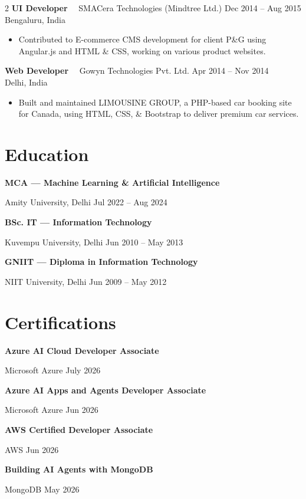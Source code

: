 \documentclass[10pt,a4paper]{article}
\newcommand{\job}[4]{%
  \vspace{2pt}
  {\fontsize{10.5}{12}\bfseries\color{sidebar}#1}
  {\color{textmuted}\ \textbar\ #2}
  \hfill
  {\fontsize{8.8}{10}\color{accent}#3}\\
  {\fontsize{8.7}{10}\color{textmuted}#4}
  \vspace{1pt}
}
\newcommand{\edu}[3]{%
  {\fontsize{9}{11}\bfseries\color{sidebar}#1}\par
  {\fontsize{8.2}{10}\color{textmuted}#2}
  \hfill {\fontsize{8}{10}\color{textmuted}#3}\par
  \vspace{4pt}
}
\begin{document}
\begin{paracol}{2}
\job{UI Developer}{SMACera Technologies (Mindtree Ltd.)}{Dec 2014 -- Aug 2015}{Bengaluru, India}
\begin{itemize}
  \item Contributed to E-commerce CMS development for client P\&G using Angular.js and HTML \& CSS, working on various product websites.
\end{itemize}

\job{Web Developer}{Gowyn Technologies Pvt. Ltd.}{Apr 2014 -- Nov 2014}{Delhi, India}
\begin{itemize}
  \item Built and maintained LIMOUSINE GROUP, a PHP-based car booking site for Canada, using HTML, CSS, \& Bootstrap to deliver premium car services.
\end{itemize}

\section{Education}

\edu{MCA — Machine Learning \& Artificial Intelligence}{Amity University, Delhi}{Jul 2022 -- Aug 2024}
\edu{BSc. IT — Information Technology}{Kuvempu University, Delhi}{Jun 2010 -- May 2013}
\edu{GNIIT — Diploma in Information Technology}{NIIT University, Delhi}{Jun 2009 -- May 2012}

\section{Certifications}

\edu{Azure AI Cloud Developer Associate}{Microsoft Azure}{July 2026}
\edu{Azure AI Apps and Agents Developer Associate}{Microsoft Azure}{Jun 2026}
\edu{AWS Certified Developer Associate}{AWS}{Jun 2026}
\edu{Building AI Agents with MongoDB}{MongoDB}{May 2026}

\end{paracol}
\end{document}

